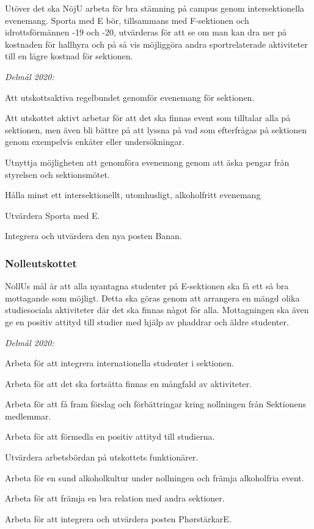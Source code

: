 \documentclass[10pt]{article}
\begin{document}
    Utöver det ska NöjU arbeta för bra stämning på campus genom intersektionella evenemang. Sporta med E bör, tillsammans med F-sektionen och idrottsförmännen -19 och -20, utvärderas för att se om man kan dra ner på kostnaden för hallhyra och på så vis möjliggöra andra sportrelaterade aktiviteter till en lägre kostnad för sektionen.  
    
    
    \emph{Delmål 2020:}
    \begin{dashlist}
        \item Att utskottsaktiva regelbundet genomför evenemang för sektionen.
        \item Att utskottet aktivt arbetar för att det ska finnas event som tilltalar alla på sektionen, men även bli bättre på att lyssna på vad som efterfrågas på sektionen genom exempelvis enkäter eller undersökningar.
        \item Utnyttja möjligheten att genomföra evenemang genom att äska pengar från styrelsen och sektionsmötet.
        \item Hålla minst ett intersektionellt, utomhusligt, alkoholfritt evenemang
        \item Utvärdera Sporta med E.
        \item Integrera och utvärdera den nya posten Banan.
    \end{dashlist}
    
    \subsubsection*{Nolleutskottet}
    NollUs mål är att alla nyantagna studenter på E-sektionen ska få ett så bra mottagande som möjligt. Detta ska göras genom att arrangera en mängd olika studiesociala aktiviteter där det ska finnas något för alla. Mottagningen ska även ge en positiv attityd till studier med hjälp av phaddrar och äldre studenter. 
    
    \emph{Delmål 2020:}
    \begin{dashlist}
        \item Arbeta för att integrera internationella studenter i sektionen. 
        \item Arbeta för att det ska fortsätta finnas en mångfald av aktiviteter.
        \item Arbeta för att få fram förslag och förbättringar kring nollningen från Sektionens medlemmar.
        \item Arbeta för att förmedla en positiv attityd till studierna.
        \item Utvärdera arbetsbördan på utskottets funktionärer.
        \item Arbeta för en sund alkoholkultur under nollningen och främja alkoholfria event.
        \item Arbeta för att främja en bra relation med andra sektioner.
        \item Arbeta för att integrera och utvärdera posten PhørstärkarE.
    \end{dashlist}
    
\end{document}
